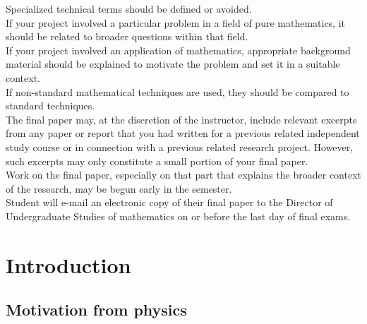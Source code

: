 \documentclass[a4paper]{article}
\begin{document}
Specialized technical terms should be defined or avoided. \\

If your project involved a particular problem in a field of pure mathematics, it should be related to broader questions within that field. \\

If your project involved an application of mathematics, appropriate background material should be explained to motivate the problem and set it in a suitable context. \\

If non-standard mathematical techniques are used, they should be compared to standard techniques. \\

The final paper may, at the discretion of the instructor, include relevant excerpts from any paper or report that you had written for a previous related independent study course or in connection with a previous related research project. However, such excerpts may only constitute a small portion of your final paper. \\

Work on the final paper, especially on that part that explains the broader context of the research, may be begun early in the semester. \\

Student will e-mail an electronic copy of their final paper to the Director of Undergraduate Studies of mathematics on or before the last day of final exams. \\

\newpage

\maketitle

\section{Introduction}

\subsection{Motivation from physics}
\end{document}
